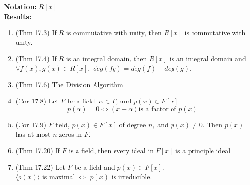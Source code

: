 \documentclass[12pt]{article}
\begin{document}
\noindent \textbf{Notation:} $R[x]$\\

\noindent \textbf{Results:} 
\begin{enumerate}
	\item (Thm 17.3) If $R$ is commutative with unity, then $R[x]$ is commutative with unity.
	\item (Thm 17.4) If $R$ is an integral domain, then $R[x]$ is an integral domain and $\forall f(x),g(x) \in R[x],$ $deg(fg)=deg(f)+deg(g).$
	\item (Thm 17.6) The Division Algorithm
	\item (Cor 17.8) Let $F$ be a field, $\alpha \in F$, and $p(x) \in F[x].$ \\
	$$p(\alpha)=0 \Leftrightarrow (x-\alpha) \text{is a factor of }p(x)$$ 
	\item (Cor 17.9) $F$ field, $p(x) \in F[x]$ of degree $n,$ and $p(x) \not = 0.$ Then $p(x)$ has at most $n$ zeros in $F.$
	\item (Thm 17.20) If $F$ is a field, then every ideal in $F[x]$ is a principle ideal.
	\item (Thm 17.22) Let $F$ be a field and $p(x) \in F[x].$ \\
	$\langle p(x) \rangle$ is maximal $\Leftrightarrow$ $p(x)$ is irreducible.
\end{enumerate} 
\end{document}
